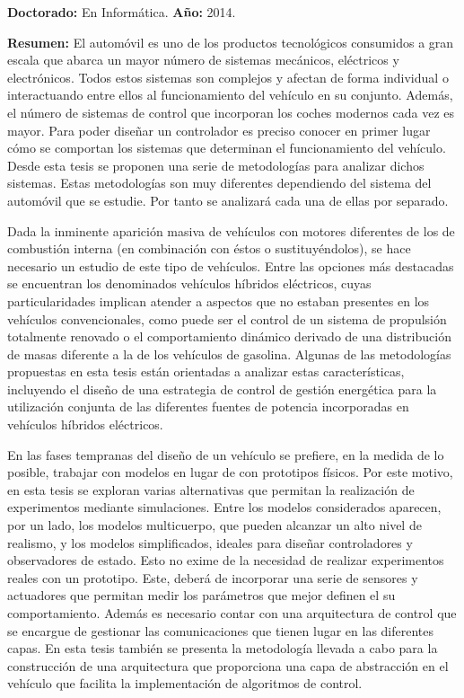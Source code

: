 \textbf{Doctorado:} En Informática. \textbf{Año:} 2014. 
 
\textbf{Resumen:} El automóvil es uno de los productos tecnológicos consumidos a gran escala que abarca un mayor número de sistemas mecánicos, eléctricos y electrónicos. Todos estos sistemas son complejos y afectan de forma individual o interactuando entre ellos al funcionamiento del vehículo en su conjunto. Además, el número de sistemas de control que incorporan los coches modernos cada vez es mayor. Para poder diseñar un controlador es preciso conocer en primer lugar cómo se comportan los sistemas que determinan el funcionamiento del vehículo. Desde esta tesis se proponen una serie de metodologías para analizar dichos sistemas. Estas metodologías son muy diferentes dependiendo del sistema del automóvil que se estudie. Por tanto se analizará cada una de ellas por separado.

Dada la inminente aparición masiva de vehículos con motores diferentes de los de combustión interna (en combinación con éstos o sustituyéndolos), se hace necesario un estudio de este tipo de vehículos. Entre las opciones más destacadas se encuentran los denominados vehículos híbridos eléctricos, cuyas particularidades implican atender a aspectos que no estaban presentes en los vehículos convencionales, como puede ser el control de un sistema de propulsión totalmente renovado o el comportamiento dinámico derivado de una distribución de masas diferente a la de los vehículos de gasolina. Algunas de las metodologías propuestas en esta tesis están orientadas a analizar estas características, incluyendo el diseño de una estrategia de control de gestión energética para la utilización conjunta de las diferentes fuentes de potencia incorporadas en vehículos híbridos eléctricos.

En las fases tempranas del diseño de un vehículo se prefiere, en la medida de lo posible, trabajar con modelos en lugar de con prototipos físicos. Por este motivo, en esta tesis se exploran varias alternativas que permitan la realización de experimentos mediante simulaciones. Entre los modelos considerados aparecen, por un lado, los modelos multicuerpo, que pueden alcanzar un alto nivel de realismo, y los modelos simplificados, ideales para diseñar controladores y observadores de estado. Esto no exime de la necesidad de realizar experimentos reales con un prototipo. Este, deberá de incorporar una serie de sensores y actuadores que permitan medir los parámetros que mejor definen el su comportamiento. Además es necesario contar con una arquitectura de control que se encargue de gestionar las comunicaciones que tienen lugar en las diferentes capas. En esta tesis también se presenta la metodología llevada a cabo para la construcción de una arquitectura que proporciona una capa de abstracción en el vehículo que facilita la implementación de algoritmos de control.
 
